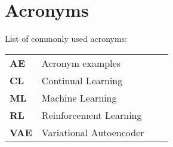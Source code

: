 
\chapter{Acronyms}
\label{chap:acronyms}

List of commonly used acronyms: \\

\begin{tabular}{llll}
	\textbf{AE}		&	Acronym examples \\
	\textbf{CL}		& 	Continual Learning \\
	\textbf{ML}		& 	Machine Learning \\
	\textbf{RL}		& 	Reinforcement Learning \\
	\textbf{VAE}		&	Variational Autoencoder \\
	
\end{tabular}